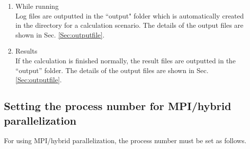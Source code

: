 \begin{enumerate}
\item While running\\
  Log files are outputted in the ``output" folder which is automatically created
  in the directory for a calculation scenario.
  The details of the output files are shown in Sec. \ref{Sec:outputfile}.

\item Results\\
  If the calculation is finished normally,
  the result files are outputted in the ``output'' folder.
  The details of the output files are shown in Sec. \ref{Sec:outputfile}.
\end{enumerate}



\newpage
\subsection{Setting the process number for MPI/hybrid parallelization}
\label{subsec:process}
For using MPI/hybrid parallelization, the process number must be set as follows.

